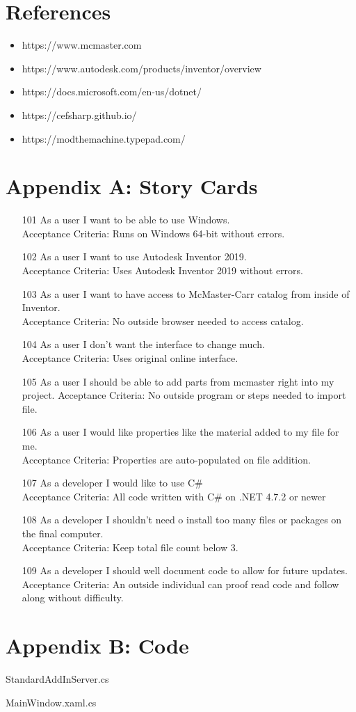 \documentclass[12pt, letterpaper]{article}
\begin{document}
\section{References}

\begin{itemize}
\item https://www.mcmaster.com
\item https://www.autodesk.com/products/inventor/overview
\item https://docs.microsoft.com/en-us/dotnet/
\item https://cefsharp.github.io/
\item https://modthemachine.typepad.com/

\end{itemize}

\newpage
\section{Appendix A: Story Cards}
\begin{itemize}
    \item [101] As a user I want to be able to use Windows.\\
    Acceptance Criteria: Runs on Windows 64-bit without errors.
    \item [102] As a user I want to use Autodesk Inventor 2019.\\
    Acceptance Criteria: Uses Autodesk Inventor 2019 without errors.
    \item [103] As a user I want to have access to McMaster-Carr catalog from inside of Inventor.\\
    Acceptance Criteria: No outside browser needed to access catalog.
    \item [104] As a user I don't want the interface to change much.\\
    Acceptance Criteria: Uses original online interface.
    \item [105] As a user I should be able to add parts from mcmaster right into my project.
    Acceptance Criteria: No outside program or steps needed to import file.
    \item [106] As a user I would like properties like the material added to my file for me.\\
    Acceptance Criteria: Properties are auto-populated on file addition.
    \item [107] As a developer I would like to use C\# \\
    Acceptance Criteria: All code written with C# on .NET 4.7.2 or newer
    \item [108] As a developer I shouldn't need o install too many files or packages on the final computer.\\
    Acceptance Criteria: Keep total file count below 3.
    \item [109] As a developer I should well document code to allow for future updates.\\
    Acceptance Criteria: An outside individual can proof read code and follow along without difficulty.
\end{itemize}



\newpage
\section{Appendix B: Code}
StandardAddInServer.cs
\lstset{style=sharpc}

\newpage
MainWindow.xaml.cs

\end{document}

